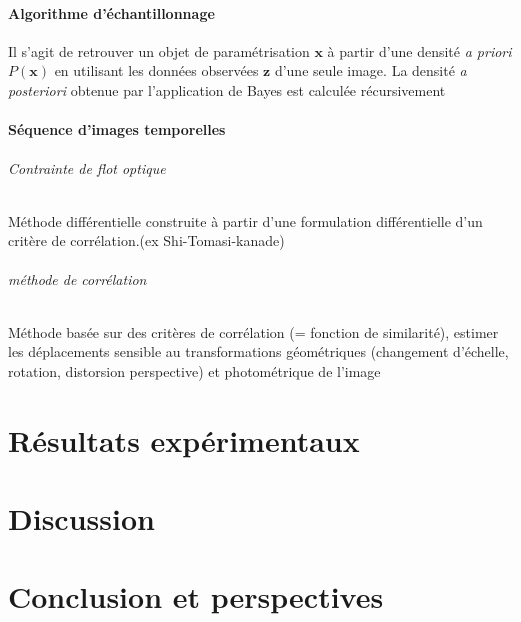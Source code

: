 \documentclass[a4paper,12pt]{report}
\begin{document}
\subsubsection{Algorithme d'échantillonnage}
Il s'agit de retrouver un objet de paramétrisation $\mathbf{x}$ à partir d'une densité \textit{a priori} $P(\mathbf{x})$ en utilisant les données observées $\mathbf{z}$ d'une seule image.
La densité \textit{a posteriori} obtenue par l'application de Bayes est calculée récursivement  
\subsubsection{Séquence d'images temporelles}

\subparagraph{Contrainte de flot optique}
Méthode différentielle construite à partir d'une formulation différentielle d'un critère de corrélation.(ex Shi-Tomasi-kanade)
\subparagraph{méthode de corrélation}
Méthode basée sur des critères de corrélation (= fonction de similarité), 
estimer les déplacements
sensible au transformations géométriques (changement d'échelle, rotation, distorsion perspective) et photométrique de l'image


\chapter{Résultats expérimentaux}



\chapter{Discussion}



\chapter{Conclusion et perspectives}






\nocite{*}

\listoffigures
\end{document}
